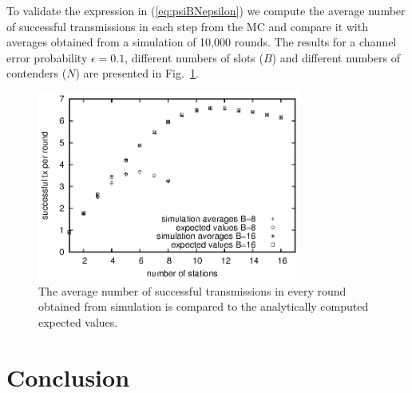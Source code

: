 \documentclass[journal]{IEEEtran}
\begin{document}


To validate the expression in (\ref{eq:psiBNepsilon}) we compute the average number of successful transmissions in each step from the MC and compare it with averages obtained from a simulation of 10,000 rounds.
The results for a channel error probability $\epsilon=0.1$, different numbers of slots ($B$) and different numbers of contenders ($N$) are presented in Fig.~\ref{fig:successful_tx_per_step}.

\begin{figure}[t!!!!]
\centering
\includegraphics[height=6.2cm]{figures/successful_tx_per_step}
\caption{The average number of successful transmissions in every round obtained from simulation is compared to the analytically computed expected values.}
\label{fig:successful_tx_per_step}
\end{figure}

\section{Conclusion}
\label{sec:conclusion}
\end{document}
